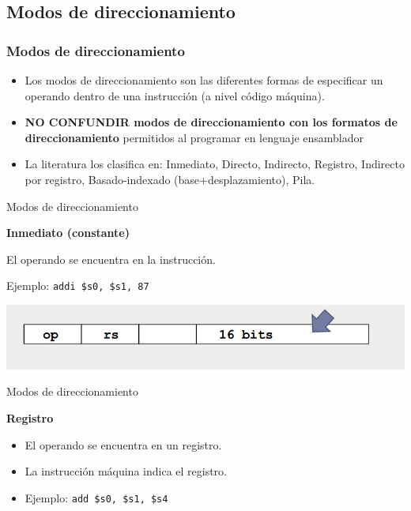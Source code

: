 \documentclass[aspectratio=169,compress]{beamer}
\begin{document}
\begin{footnotesize}
\subsection{Modos de direccionamiento}

\begin{frame}[fragile]
\frametitle{Modos de direccionamiento}
\begin{itemize}
\item Los modos de direccionamiento son las diferentes formas de especificar un operando dentro de una instrucción (a nivel código máquina).
\item \textbf{NO CONFUNDIR modos de direccionamiento con los formatos de direccionamiento} permitidos al programar en lenguaje ensamblador
\item La literatura los clasifica en: Inmediato, Directo, Indirecto, Registro, Indirecto por registro, Basado-indexado (base+desplazamiento), Pila.
\end{itemize}
\end{frame}


\begin{frame}{Modos de direccionamiento}
\begin{center}\textbf{Inmediato (constante)}\end{center}
El operando se encuentra en la instrucción.

Ejemplo: \texttt{addi \$s0, \$s1, 87} 

	\begin{center}
\includegraphics[scale=0.3]{images/dir-inmediato.jpg} 
	\end{center}
\end{frame}


\begin{frame}{Modos de direccionamiento}
\begin{center}\textbf{Registro}\end{center}

\begin{itemize}
\item El operando se encuentra en un registro.
\item La instrucción máquina indica el registro.
\item Ejemplo: \texttt{add \$s0, \$s1, \$s4} 


\end{itemize}
\end{frame}
\end{footnotesize}
\end{document}
